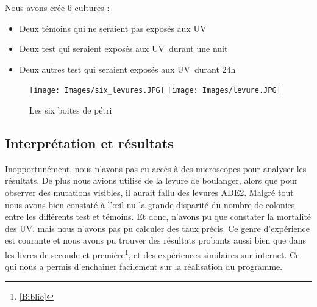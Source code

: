     Nous avons crée 6 cultures : 
    \begin{itemize}
      \item Deux témoins qui ne seraient pas exposés aux UV
      \item Deux test qui seraient exposés aux UV durant une nuit
      \item Deux autres test qui seraient exposés aux UV durant 24h
    \end{itemize}
    
    \begin{figure}[H]
			\begin{center}
				\texttt{[image: Images/six\_levures.JPG]}
				\texttt{[image: Images/levure.JPG]}
			\end{center}
			\caption{Les six boites de pétri}
		\end{figure}

  
\subsection{Interprétation et résultats}
  Inopportunément, nous n'avons pas eu accès à des microscopes pour analyser les résultats. De plus nous avions utilisé de la levure de boulanger, alors que pour observer des mutations visibles, il aurait fallu des levures ADE2. Malgré tout nous avons bien constaté à l'œil nu la grande disparité du nombre de colonies entre les différents test et témoins. Et donc, n'avons pu que constater la mortalité des UV, mais nous n'avons pas pu calculer des taux précis.
  Ce genre d'expérience est courante et nous avons pu trouver des résultats probants aussi bien que dans les livres de seconde et première\footnote{\ref{Biblio}}, et des expériences similaires sur internet. Ce qui nous a permis d'enchaîner facilement sur la réalisation du programme.
  
  

